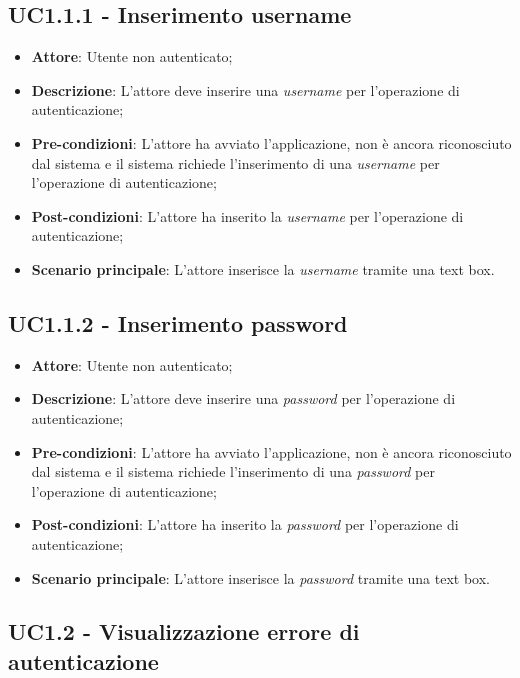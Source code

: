 \subsection{UC1.1.1 - Inserimento username}

\begin{itemize}
	\item \textbf{Attore}: Utente non autenticato;
	\item \textbf{Descrizione}: L'attore deve inserire una \textit{username} per l'operazione di autenticazione;
	\item \textbf{Pre-condizioni}: L'attore ha avviato l'applicazione, non è ancora riconosciuto dal sistema e il sistema richiede l'inserimento di una \textit{username} per l'operazione di autenticazione;
	\item \textbf{Post-condizioni}: L'attore ha inserito la \textit{username} per l'operazione di autenticazione;
	\item \textbf{Scenario principale}: L'attore inserisce la \textit{username} tramite una text box.
\end{itemize}

\subsection{UC1.1.2 - Inserimento password}

\begin{itemize}
	\item \textbf{Attore}: Utente non autenticato;
	\item \textbf{Descrizione}: L'attore deve inserire una \textit{password} per l'operazione di autenticazione;
	\item \textbf{Pre-condizioni}: L'attore ha avviato l'applicazione, non è ancora riconosciuto dal sistema e il sistema richiede l'inserimento di una \textit{password} per l'operazione di autenticazione;
	\item \textbf{Post-condizioni}: L'attore ha inserito la \textit{password} per l'operazione di autenticazione;
	\item \textbf{Scenario principale}: L'attore inserisce la \textit{password} tramite una text box.
\end{itemize}

\subsection{UC1.2 - Visualizzazione errore di autenticazione}

